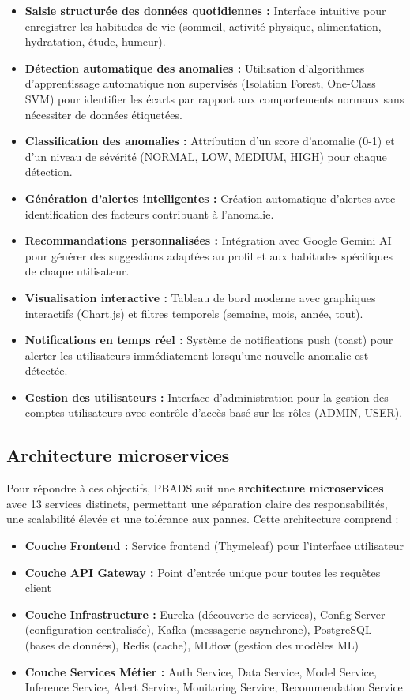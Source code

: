 \begin{itemize}
    \item \textbf{Saisie structurée des données quotidiennes :} Interface intuitive pour enregistrer les habitudes de vie (sommeil, activité physique, alimentation, hydratation, étude, humeur).
    \item \textbf{Détection automatique des anomalies :} Utilisation d'algorithmes d'apprentissage automatique non supervisés (Isolation Forest, One-Class SVM) pour identifier les écarts par rapport aux comportements normaux sans nécessiter de données étiquetées.
    \item \textbf{Classification des anomalies :} Attribution d'un score d'anomalie (0-1) et d'un niveau de sévérité (NORMAL, LOW, MEDIUM, HIGH) pour chaque détection.
    \item \textbf{Génération d'alertes intelligentes :} Création automatique d'alertes avec identification des facteurs contribuant à l'anomalie.
    \item \textbf{Recommandations personnalisées :} Intégration avec Google Gemini AI pour générer des suggestions adaptées au profil et aux habitudes spécifiques de chaque utilisateur.
    \item \textbf{Visualisation interactive :} Tableau de bord moderne avec graphiques interactifs (Chart.js) et filtres temporels (semaine, mois, année, tout).
    \item \textbf{Notifications en temps réel :} Système de notifications push (toast) pour alerter les utilisateurs immédiatement lorsqu'une nouvelle anomalie est détectée.
    \item \textbf{Gestion des utilisateurs :} Interface d'administration pour la gestion des comptes utilisateurs avec contrôle d'accès basé sur les rôles (ADMIN, USER).
\end{itemize}

\subsection{Architecture microservices}
Pour répondre à ces objectifs, PBADS suit une \textbf{architecture microservices} avec 13 services distincts, permettant une séparation claire des responsabilités, une scalabilité élevée et une tolérance aux pannes. Cette architecture comprend :

\begin{itemize}
    \item \textbf{Couche Frontend :} Service frontend (Thymeleaf) pour l'interface utilisateur
    \item \textbf{Couche API Gateway :} Point d'entrée unique pour toutes les requêtes client
    \item \textbf{Couche Infrastructure :} Eureka (découverte de services), Config Server (configuration centralisée), Kafka (messagerie asynchrone), PostgreSQL (bases de données), Redis (cache), MLflow (gestion des modèles ML)
    \item \textbf{Couche Services Métier :} Auth Service, Data Service, Model Service, Inference Service, Alert Service, Monitoring Service, Recommendation Service
\end{itemize}

